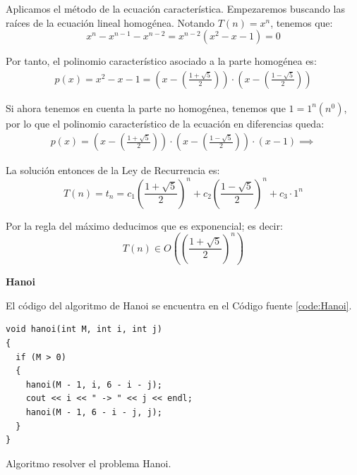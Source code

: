 \documentclass[12pt]{article}
\begin{document}
    Aplicamos el método de la ecuación característica. Empezaremos buscando las raíces de la ecuación lineal homogénea. Notando $T(n)=x^n$, tenemos que:
    \begin{equation*}
        x^n - x^{n-1} - x^{n-2} = x^{n-2}(x^2-x-1) = 0
    \end{equation*}

    Por tanto, el polinomio característico asociado a la parte homogénea es:
    \begin{gather*}
        p(x) = x^2-x-1 = \left(x-\left(\frac{1+\sqrt{5}}{2}\right)\right)\cdot \left(x-\left(\frac{1-\sqrt{5}}{2}\right)\right)
    \end{gather*}

    Si ahora tenemos en cuenta la parte no homogénea, tenemos que $1=1^n(n^0)$, por lo que el polinomio característico de la ecuación en diferencias queda:
    \begin{gather*}
         p(x) = \left(x-\left(\frac{1+\sqrt{5}}{2}\right)\right)\cdot \left(x-\left(\frac{1-\sqrt{5}}{2}\right)\right)\cdot (x-1) \implies
    \end{gather*}

    La solución entonces de la Ley de Recurrencia es:
    \begin{equation*}
        T(n)=t_n = c_1 \left(\frac{1+\sqrt{5}}{2}\right)^n + c_2 \left(\frac{1-\sqrt{5}}{2}\right)^n + c_3 \cdot 1^n
    \end{equation*}

    Por la regla del máximo deducimos que es exponencial; es decir:
    \begin{equation*}
        T(n) \in O\left(\left(\frac{1+\sqrt{5}}{2}\right)^n\right)
    \end{equation*}
    
    \textbf{Hanoi}
    
    El código del algoritmo de Hanoi se encuentra en el Código fuente \ref{code:Hanoi}.

        \begin{listing}
        \begin{verbatim}
void hanoi(int M, int i, int j)
{
  if (M > 0)
  {
    hanoi(M - 1, i, 6 - i - j);
    cout << i << " -> " << j << endl;
    hanoi(M - 1, 6 - i - j, j);
  }
}
        \end{verbatim}
        \caption{Algoritmo resolver el problema Hanoi.}
        \label{code:Hanoi}
    \end{listing}
    
\end{document}
